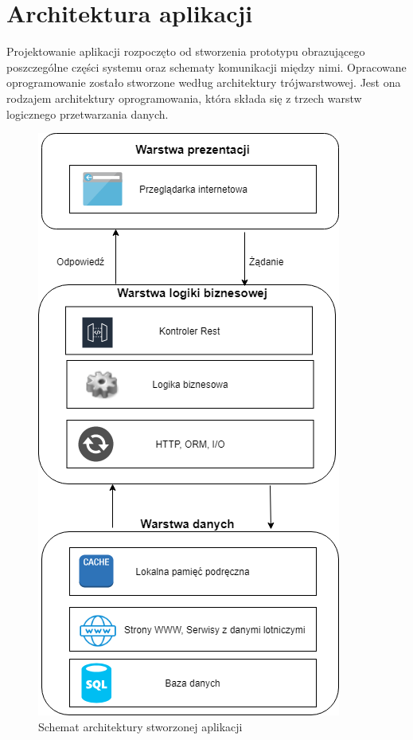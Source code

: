 \documentclass[12pt, twoside]{report}
\begin{document}
\section{Architektura aplikacji}
Projektowanie aplikacji rozpoczęto od stworzenia prototypu obrazującego poszczególne części systemu oraz schematy komunikacji między nimi. Opracowane oprogramowanie zostało stworzone według architektury trójwarstwowej. Jest ona rodzajem architektury oprogramowania, która składa się z trzech warstw logicznego przetwarzania danych\cite{architektura}.

\begin{figure}[!ht]
\centering
\includegraphics[scale=0.60, keepaspectratio]{architecure_diagram.png}
\caption{Schemat architektury stworzonej aplikacji}
\label{fig:architecure_diagram}
\end{figure}
\end{document}
